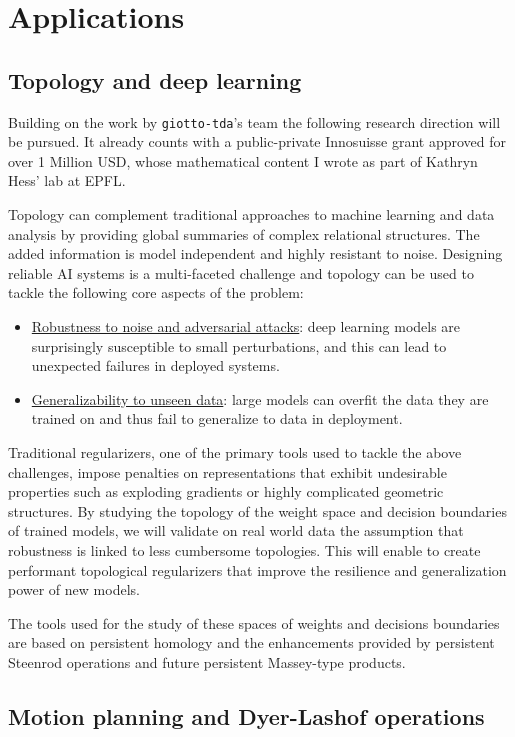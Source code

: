 
\section{Applications} \label{s:applications}

\subsection{Topology and deep learning}

Building on the work by \texttt{giotto-tda}'s team the following research direction will be pursued.
It already counts with a public-private Innosuisse grant approved for over 1 Million USD, whose mathematical content I wrote as part of Kathryn Hess' lab at EPFL.

Topology can complement traditional approaches to machine learning and data analysis by providing global summaries of complex relational structures.
The added information is model independent and highly resistant to noise.
Designing reliable AI systems is a multi-faceted challenge and topology can be used to tackle the following core aspects of the problem:
\begin{itemize}
	\item \underline{Robustness to noise and adversarial attacks}: deep learning models are surprisingly susceptible to small perturbations, and this can lead to unexpected failures in deployed systems.
	\item \underline{Generalizability to unseen data}: large models can overfit the data they are trained on and thus fail to generalize to data in deployment.
\end{itemize}
Traditional regularizers, one of the primary tools used to tackle the above challenges, impose penalties on representations that exhibit undesirable properties such as exploding gradients or highly complicated geometric structures.
By studying the topology of the weight space and decision boundaries of trained models, we will validate on real world data the assumption that robustness is linked to less cumbersome topologies.
This will enable to create performant topological regularizers that improve the resilience and generalization power of new models.

The tools used for the study of these spaces of weights and decisions boundaries are based on persistent homology and the enhancements provided by persistent Steenrod operations and future persistent Massey-type products.

\subsection{Motion planning and Dyer-Lashof operations}

